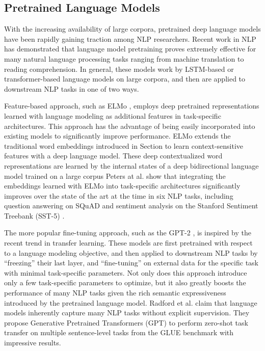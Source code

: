 

\subsection{Pretrained Language Models}

With the increasing availability of large corpora, pretrained deep language models have been rapidly gaining traction among NLP researchers.
Recent work in NLP has demonstrated that language model pretraining proves extremely effective for many natural language processing tasks ranging from machine translation to reading comprehension.
In general, these models work by LSTM-based or transformer-based language models on large corpora, and then are applied to downstream NLP tasks in one of two ways.

Feature-based approach, such as ELMo \cite{peters2018deep}, employs deep pretrained representations learned with language modeling as additional features in task-specific architectures.
This approach has the advantage of being easily incorporated into existing models to significantly improve performance.
ELMo \cite{peters2018deep} extends the traditional word embeddings introduced in Section  to learn context-sensitive features with a deep language model.
These deep contextualized word representations are learned by  the internal states of a deep bidirectional language model trained on a large corpus 
Peters at al. \cite{peters2018deep} show that integrating the embeddings learned with ELMo into task-specific architectures significantly improves over the state of the art at the time in six NLP tasks, including question answering on SQuAD \cite{rajpurkar2016squad} and sentiment analysis on the Stanford Sentiment Treebank (SST-5) \cite{socher2013recursive}.

The more popular fine-tuning approach, such as the GPT-2 \cite{radford2019language}, is inspired by the recent trend in transfer learning.
These models are first pretrained with respect to a language modeling objective, and then applied to downstream NLP tasks by ``freezing'' their last layer, and ``fine-tuning'' on external data for the specific task with minimal task-specific parameters.
Not only does this approach introduce only a few task-specific parameters to optimize, but it also greatly boosts the performance of many NLP tasks given the rich semantic expressiveness introduced by the pretrained language model.
Radford et al. \cite{radford2019language} claim that language models inherently capture many NLP tasks without explicit supervision.
They propose Generative Pretrained Transformers (GPT) to perform zero-shot task transfer on multiple sentence-level tasks from the GLUE benchmark \cite{wang2018glue} with impressive results.

